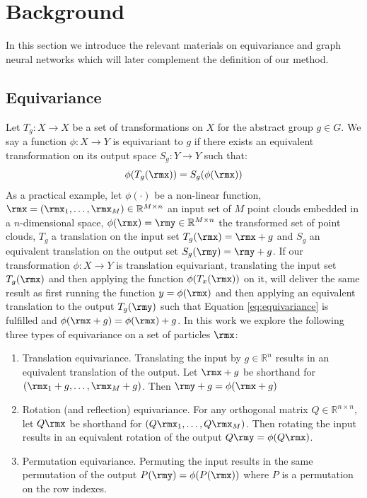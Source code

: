 
\section{Background}
In this section we introduce the relevant materials on equivariance and graph neural networks which will later complement the definition of our method.

\subsection{Equivariance}
\label{sec:background_equivariance}
Let $T_g: X \xrightarrow{} X$ be a set of transformations on $X$ for the abstract group $g \in G$. We say a function $\phi: X \xrightarrow{} Y$ is equivariant to $g$ if there exists an equivalent transformation on its output space $S_g: Y \xrightarrow{} Y$  such that:
\begin{equation} \label{eq:equivariance}
    \phi(T_g(\rmx)) = S_g(\phi(\rmx)) 
\end{equation}
As a practical example, let $\phi(\cdot)$ be a non-linear function, $\rmx = (\rmx_1, \dots, \rmx_M) \in \mathbb{R}^{M \times n}$ an input set of $M$ point clouds embedded in a $n$-dimensional space, $\phi(\rmx) = \rmy \in \mathbb{R}^{M \times n}$ the transformed set of point clouds, $T_g$ a translation on the input set $T_g(\rmx) = \rmx + g$ and $S_g$ an equivalent translation on the output set $S_g(\rmy) = \rmy + g$. If our transformation $\phi: X \xrightarrow{} Y$ is translation equivariant, translating the input set $T_g(\rmx)$ and then applying the function $\phi(T_x(\rmx))$ on it, will deliver the same result as first running the function $y=\phi(\rmx)$ and then applying an equivalent translation to the output $T_g(\rmy)$ such that Equation \ref{eq:equivariance} is fulfilled and $\phi(\rmx + g) = \phi(\rmx) + g$. In this work we explore the following three types of equivariance on a set of particles $\rmx$:
\begin{enumerate}[nolistsep]
    \item Translation equivariance. Translating the input by $g \in \mathbb{R}^n$ results in an equivalent translation of the output. Let $\rmx + g$ be shorthand for $(\rmx_1 + g, \ldots, \rmx_M + g)$. Then $\rmy + g = \phi(\rmx + g)$ 
    \item Rotation (and reflection) equivariance. For any orthogonal matrix $Q \in \mathbb{R}^{n \times n}$, let $Q\rmx$ be shorthand for $(Q\rmx_1, \ldots, Q\rmx_M)$. Then rotating the input results in an equivalent rotation of the output $Q\rmy = \phi(Q\rmx)$.
    \item Permutation equivariance. Permuting the input results in the same permutation of the output $P(\rmy) = \phi(P(\rmx))$ where $P$ is a permutation on the row indexes.
\end{enumerate}

